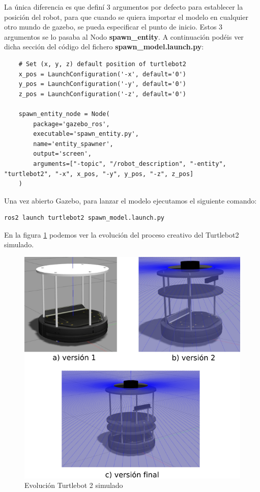 La única diferencia es que definí 3 argumentos por defecto para establecer la posición del robot, para que cuando se quiera importar el modelo en cualquier otro mundo de gazebo, se pueda especificar el punto de inicio. Estos 3 argumentos se lo pasaba al Nodo \textbf{spawn\_entity}. A continuación podéis ver dicha sección del código del fichero \textbf{spawn\_model.launch.py}:
\begin{lstlisting}
	# Set (x, y, z) default position of turtlebot2
	x_pos = LaunchConfiguration('-x', default='0')
	y_pos = LaunchConfiguration('-y', default='0')
	z_pos = LaunchConfiguration('-z', default='0')
	
	spawn_entity_node = Node(
		package='gazebo_ros',
		executable='spawn_entity.py',
		name='entity_spawner',
		output='screen',
		arguments=["-topic", "/robot_description", "-entity", "turtlebot2", "-x", x_pos, "-y", y_pos, "-z", z_pos]
	)
\end{lstlisting}

Una vez abierto Gazebo, para lanzar el modelo ejecutamos el siguiente comando:
\begin{lstlisting}
ros2 launch turtlebot2 spawn_model.launch.py
\end{lstlisting}

En la figura \ref{fig:evolucion_turtlebot2_sim} podemos ver la evolución del proceso creativo del Turtlebot2 simulado.
\begin{figure} [H]
  \begin{center}
    \includegraphics[width=15cm]{imagenes/creacion-turtlebot2-sim.png}
  \end{center}
  \caption[Evolución Turtlebot 2 simulado]{Evolución Turtlebot 2 simulado}
  \label{fig:evolucion_turtlebot2_sim}
\end{figure}


